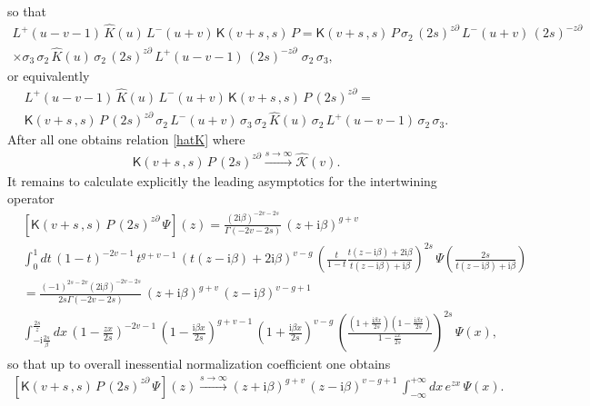 \documentclass[11pt]{article}
\numberwithin{equation}{section}
\theoremstyle{plain}
\theoremstyle{definition}
\newcommand{\K}{\mathsf{K}}
\renewcommand{\imath}{\mathrm{i}}
\begin{document}
so that 
\begin{multline*} 
	L^{+}(u-v-1)\,\hat{K}(u)\,L^{-}(u+v)\,\K(v+s\,,s)\,P = 
	\K(v+s\,,s)\,P\,\sigma_2\,(2s)^{z\partial}\,
	L^{-}(u+v)\,(2s)^{-z\partial}\,\,\\ 
	\times\sigma_3\,\sigma_2\,
	\hat{K}(u)\,\sigma_2\,(2s)^{z\partial}\,
	L^{+}(u-v-1)\,(2s)^{-z\partial}\,\,\sigma_2\,\sigma_3 ,
\end{multline*}
or equivalently 
\begin{multline*} 
	L^{+}(u-v-1)\,\hat{K}(u)\,L^{-}(u+v)\,\K(v+s\,,s)\,P\,(2s)^{z\partial} = \\
	\K(v+s\,,s)\,P\,(2s)^{z\partial}\,
	\sigma_2\,L^{-}(u+v)\,\sigma_3\,\sigma_2\,
	\hat{K}(u)\,\sigma_2\,
	L^{+}(u-v-1)\,\sigma_2\,\sigma_3 .
\end{multline*}
After all one obtains relation \eqref{hatK} where 
\begin{align*}
	\K(v+s\,,s)\,P\,(2s)^{z\partial} 
	\xrightarrow{s\to\infty} \hat{\mathcal{K}}(v).
\end{align*}
It remains to calculate explicitly the leading asymptotics for the 
intertwining operator  
\begin{align*}
	&\left[\K(v+s\,,s)\,P\,(2s)^{z\partial}\,\Psi\right](z) = \frac{(2\imath\beta)^{-2v-2s}}{\Gamma(-2v-2s)}\,(z+\imath \beta)^{g+v}\\
	&\int_0^1 d t\,(1-t)^{-2v-1}\,t^{g+v-1}\,
	\left(t(z-\imath\beta)+2\imath\beta\right)^{v-g}\,
	\left(\frac{t}{1-t}\frac{t(z-\imath\beta)+2\imath\beta}{t(z-\imath\beta)+\imath\beta}\right)^{2s}\,
	\Psi\left(\frac{2s}{t(z-\imath\beta)+\imath\beta}\right)  \\[4pt]
	& = \frac{(-1)^{2s-2v}(2\imath\beta)^{-2v-2s}}{2s \Gamma(-2v-2s)}\,
	(z+\imath\beta)^{g+v}\,(z-\imath\beta)^{v-g+1}\\
	&\int_{-\imath\frac{2s}{\beta}}^{\frac{2s}{z}} d x\,
	\left(1-\frac{z x}{2s}\right)^{-2v-1}\,
	\left(1-\frac{\imath\beta x}{2s}\right)^{g+v-1}\,
	\left(1+\frac{\imath\beta x}{2s}\right)^{v-g}\,
	\left(\frac{\left(1+\frac{\imath\beta x}{2s}\right)
		\left(1-\frac{\imath\beta x}{2s}\right)}{1-\frac{z x}{2s}}\right)^{2s}\,
	\Psi(x) ,
\end{align*}
so that up to overall inessential normalization coefficient one obtains
\begin{align*}
	\left[\K(v+s\,,s)\,P\,(2s)^{z\partial}\,\Psi\right](z) 
	\xrightarrow{s \to \infty}  
	(z+\imath\beta)^{g+v}\,(z-\imath\beta)^{v-g+1}\,
	\int_{-\infty}^{+\infty} d x\,e^{zx}\,
	\Psi(x) .
\end{align*}
\end{document}
